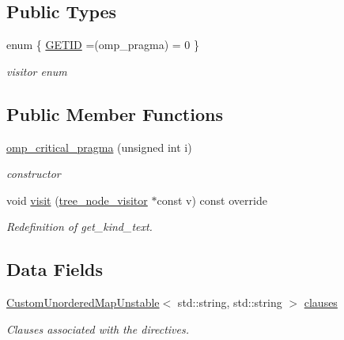 \subsection*{Public Types}
\begin{DoxyCompactItemize}
\item 
enum \{ \hyperlink{structomp__critical__pragma_a939bef2bd1af18e03fd4fb688bbdc57ca9ccff441499e54fb35fd353b3453e355}{G\+E\+T\+ID} =(omp\+\_\+pragma) = 0
 \}\begin{DoxyCompactList}\small\item\em visitor enum \end{DoxyCompactList}
\end{DoxyCompactItemize}
\subsection*{Public Member Functions}
\begin{DoxyCompactItemize}
\item 
\hyperlink{structomp__critical__pragma_ac3ae7508f5ab4c23cb78abf8aa31978e}{omp\+\_\+critical\+\_\+pragma} (unsigned int i)
\begin{DoxyCompactList}\small\item\em constructor \end{DoxyCompactList}\item 
void \hyperlink{structomp__critical__pragma_afb58812bf6b4658b1085d45711b25847}{visit} (\hyperlink{classtree__node__visitor}{tree\+\_\+node\+\_\+visitor} $\ast$const v) const override
\begin{DoxyCompactList}\small\item\em Redefinition of get\+\_\+kind\+\_\+text. \end{DoxyCompactList}\end{DoxyCompactItemize}
\subsection*{Data Fields}
\begin{DoxyCompactItemize}
\item 
\hyperlink{custom__map_8hpp_a8cbaceffc09790a885ec7e9c17809c69}{Custom\+Unordered\+Map\+Unstable}$<$ std\+::string, std\+::string $>$ \hyperlink{structomp__critical__pragma_afdd57d5aa2baa00cf8abd89ff5cd9f83}{clauses}
\begin{DoxyCompactList}\small\item\em Clauses associated with the directives. \end{DoxyCompactList}\end{DoxyCompactItemize}
